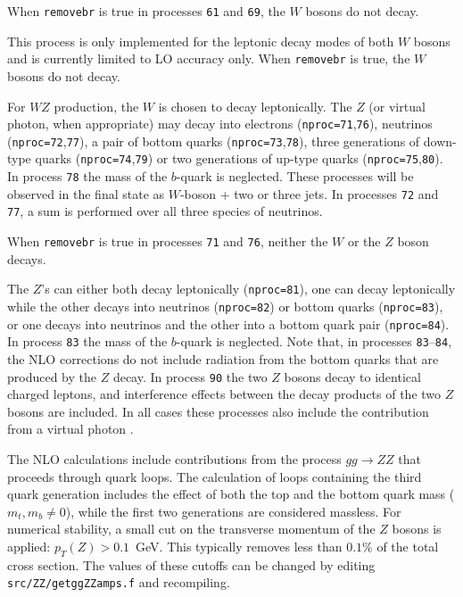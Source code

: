 When {\tt removebr} is true in processes {\tt 61} and {\tt 69},
the $W$ bosons do not decay.


This process is only implemented for the leptonic decay modes of both $W$
bosons and is currently limited to LO accuracy only. When {\tt removebr} is true,
the $W$ bosons do not decay.


For $WZ$ production, the $W$ is chosen to decay leptonically. The $Z$ (or
virtual photon, when appropriate) may decay into electrons
({\tt nproc=71},{\tt 76}), neutrinos ({\tt nproc=72},{\tt 77}), a
pair of bottom quarks ({\tt nproc=73},{\tt 78}), three generations of down-type
quarks ({\tt nproc=74},{\tt 79}) or two generations of up-type quarks ({\tt nproc=75},{\tt 80}).
In process {\tt 78} the mass of the $b$-quark is neglected.
These processes will be observed
in the final state as $W$-boson + two or three jets.
In processes {\tt 72} and {\tt 77}, a sum is performed over all three species of neutrinos.

When {\tt removebr} is true in processes {\tt 71} and {\tt 76},
neither the $W$ or the $Z$ boson decays.


The $Z$'s can either both decay leptonically ({\tt nproc=81}),
one can decay leptonically while the other decays into neutrinos
({\tt nproc=82}) or bottom quarks ({\tt nproc=83}), or
one decays into neutrinos and the other into a bottom quark pair
({\tt nproc=84}).
In process {\tt 83} the mass of the $b$-quark is neglected. Note that, in processes
{\tt 83}--{\tt 84}, the NLO corrections do not include
radiation from the bottom quarks that are produced by the $Z$ decay.
In process {\tt 90} the two $Z$ bosons decay to identical charged leptons,
and interference effects between the decay products of the two $Z$ bosons
are included.
In all cases these processes also include the contribution from a virtual photon .

The NLO calculations include contributions from the process $gg \to ZZ$
that proceeds through quark loops. The calculation of loops containing the third quark generation
includes the effect of both the top and the bottom quark mass ($m_t,m_b \neq 0$), while the first two
generations are considered massless. For numerical stability, a small cut on the
transverse momentum of the $Z$ bosons is applied: $p_T(Z)>0.1$~GeV.
This typically removes less than $0.1$\% of the total cross section. The
values of these cutoffs can be changed by editing {\tt src/ZZ/getggZZamps.f} 
and recompiling.

